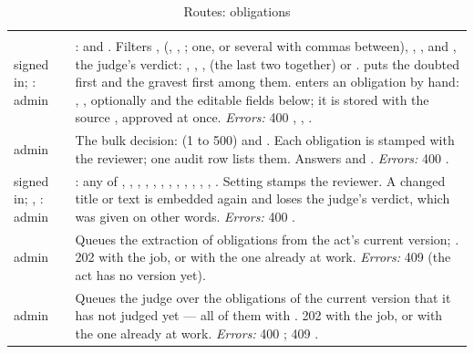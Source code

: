 \begin{xltabular}{\textwidth}{@{}L{19mm}Y@{}}
\caption{Routes: obligations}\label{tab:api:obligations}\\
\toprule {} &  \\ \midrule \endfirsthead
\toprule {} &  \\ \midrule \endhead
\bottomrule \endlastfoot
{}
signed in; : admin & :  and . Filters
  ,  (, , ; one, or
  several with commas between), , , and , the judge's verdict: ,
  , ,  (the last two together) or .
   puts the doubted first and the gravest first among them. 
  enters an obligation by hand: , , optionally  and the
  editable fields below; it is stored with the source , approved at once.
  \emph{Errors:} 400 , , . \\
\addlinespace
{}
admin & The bulk decision:  (1 to 500) and . Each obligation is stamped
  with the reviewer; one audit row lists them. Answers  and .
  \emph{Errors:} 400 . \\
\addlinespace
{}
signed in; , : admin & : any of ,
  , , , , ,
  , , , , ,
  , . Setting  stamps the reviewer. A changed title
  or text is embedded again and loses the judge's verdict, which was given on other words.
  \emph{Errors:} 400 . \\
\addlinespace
{}
admin & Queues the extraction of obligations from the act's current version; .
  202 with the job, or with the one already at work. \emph{Errors:} 409 
  (the act has no version yet). \\
\addlinespace
{}
admin & Queues the judge over the obligations of the current version that it has not judged
  yet --- all of them with . 202 with the job, or with the one already at
  work. \emph{Errors:} 400 ; 409 . \\
\end{xltabular}

